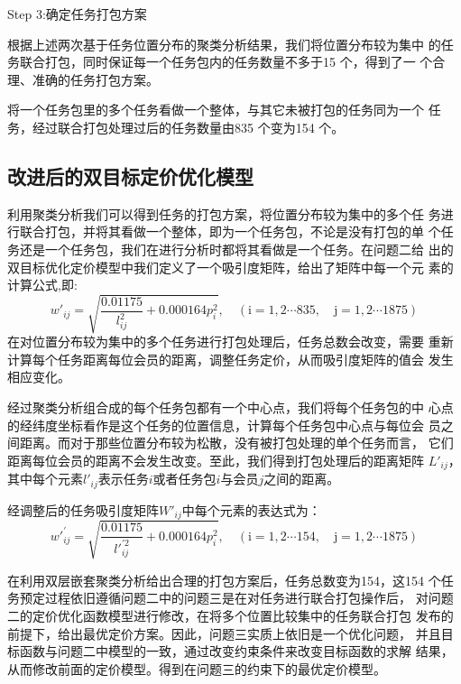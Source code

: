 Step 3:确定任务打包方案

根据上述两次基于任务位置分布的聚类分析结果，我们将位置分布较为集中
的任务联合打包，同时保证每一个任务包内的任务数量不多于15 个，得到了一
个合理、准确的任务打包方案。

将一个任务包里的多个任务看做一个整体，与其它未被打包的任务同为一个
任务，经过联合打包处理过后的任务数量由835 个变为154 个。

\subsection{改进后的双目标定价优化模型}
利用聚类分析我们可以得到任务的打包方案，将位置分布较为集中的多个任
务进行联合打包，并将其看做一个整体，即为一个任务包，不论是没有打包的单
个任务还是一个任务包，我们在进行分析时都将其看做是一个任务。在问题二给
出的双目标优化定价模型中我们定义了一个吸引度矩阵，给出了矩阵中每一个元
素的计算公式,即:
$$w'_{i j}=\sqrt{\frac{0.01175}{l_{i j}^{2}}+0.000164 p_{i}^{2}}, \quad(\mathrm{i}=1,2 \cdots 835, \quad \mathrm{j}=1,2 \cdots 1875)$$
在对位置分布较为集中的多个任务进行打包处理后，任务总数会改变，需要
重新计算每个任务距离每位会员的距离，调整任务定价，从而吸引度矩阵的值会
发生相应变化。

经过聚类分析组合成的每个任务包都有一个中心点，我们将每个任务包的中
心点的经纬度坐标看作是这个任务的位置信息，计算每个任务包中心点与每位会
员之间距离。而对于那些位置分布较为松散，没有被打包处理的单个任务而言，
它们距离每位会员的距离不会发生改变。至此，我们得到打包处理后的距离矩阵
$L'_{ij}$，其中每个元素$l'_{ij}$表示任务$i $或者任务包$i $与会员$j $之间的距离。

经调整后的任务吸引度矩阵$W'_{ij}$中每个元素的表达式为：
$${w'}_{i j}^{\prime}=\sqrt{\frac{0.01175}{{l'}_{i j}^{\prime 2}}+0.000164 p_{i}^{2}}, \quad(\mathrm{i}=1,2 \cdots 154, \quad \mathrm{j}=1,2 \cdots 1875)$$

在利用双层嵌套聚类分析给出合理的打包方案后，任务总数变为154，这154
个任务预定过程依旧遵循问题二中的问题三是在对任务进行联合打包操作后，
对问题二的定价优化函数模型进行修改，在将多个位置比较集中的任务联合打包
发布的前提下，给出最优定价方案。因此，问题三实质上依旧是一个优化问题，
并且目标函数与问题二中模型的一致，通过改变约束条件来改变目标函数的求解
结果，从而修改前面的定价模型。得到在问题三的约束下的最优定价模型。

